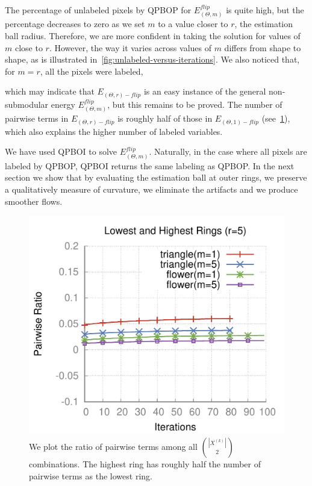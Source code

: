 The percentage of unlabeled pixels by QPBOP for $E_{(\Theta,m)}^{flip}$ is quite high, but the percentage decreases to zero as we set $m$
to a value closer to $r$, the estimation ball radius. Therefore, we are more confident in taking the solution for values of $m$ close to $r$. However, the way it
varies across values of $m$ differs from shape to shape, as is illustrated in~\cref{fig:unlabeled-versus-iterations}. We also noticed that, for $m=r$, all the pixels were labeled, {which may
  indicate that $E_{(\Theta,r)-flip}$ is an easy instance of the general non-submodular energy $E_{(\Theta,m)}^{flip}$, but this remains to be
  proved. The number of pairwise terms in $E_{(\Theta,r)-flip}$ is roughly half of those in $E_{(\Theta,1)-flip}$ (see~\cref{fig:ratio-pairwise-terms}), which also explains the higher number of labeled variables.

  We have used QPBOI to solve $E_{(\Theta,m)}^{flip}$. Naturally, in the case where all pixels are labeled by QPBOP, QPBOI returns the same labeling as QPBOP. In the next section we show that by evaluating the estimation ball at outer rings, we preserve a qualitatively measure of curvature, we eliminate the artifacts and we produce smoother flows.


\begin{figure}
\center
\includegraphics[scale=0.5]{figures/chapter6/unlabeled-ratio/plots/pairwise-ratio/h0.25/radius-5/plot-pairwiseratio-lowerHigher-concavities-probe.pdf}
\caption{We plot the ratio of pairwise terms among all $\binom{|X^{(k)}|}{2}$ combinations. The highest ring has roughly half the number of pairwise terms as the lowest ring.}
\label{fig:ratio-pairwise-terms}
\end{figure}


}
